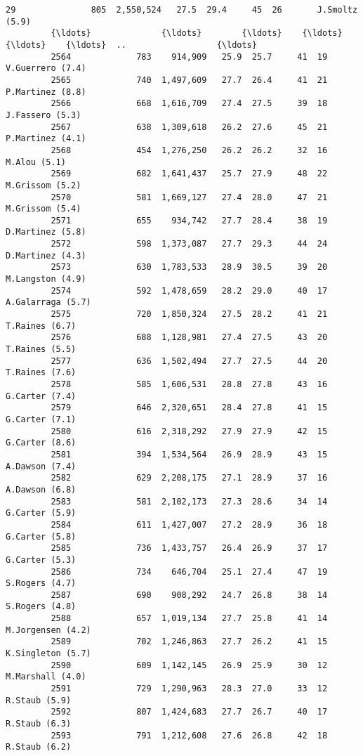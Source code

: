 \documentclass[11pt]{article}
\begin{document}
\begin{Verbatim}[commandchars=\\\{\}]
         29               805  2,550,524   27.5  29.4     45  26       J.Smoltz (5.9)   
         {\ldots}              {\ldots}        {\ldots}    {\ldots}   {\ldots}    {\ldots}  ..                  {\ldots}   
         2564             783    914,909   25.9  25.7     41  19     V.Guerrero (7.4)   
         2565             740  1,497,609   27.7  26.4     41  21     P.Martinez (8.8)   
         2566             668  1,616,709   27.4  27.5     39  18      J.Fassero (5.3)   
         2567             638  1,309,618   26.2  27.6     45  21     P.Martinez (4.1)   
         2568             454  1,276,250   26.2  26.2     32  16         M.Alou (5.1)   
         2569             682  1,641,437   25.7  27.9     48  22      M.Grissom (5.2)   
         2570             581  1,669,127   27.4  28.0     47  21      M.Grissom (5.4)   
         2571             655    934,742   27.7  28.4     38  19     D.Martinez (5.8)   
         2572             598  1,373,087   27.7  29.3     44  24     D.Martinez (4.3)   
         2573             630  1,783,533   28.9  30.5     39  20     M.Langston (4.9)   
         2574             592  1,478,659   28.2  29.0     40  17    A.Galarraga (5.7)   
         2575             720  1,850,324   27.5  28.2     41  21       T.Raines (6.7)   
         2576             688  1,128,981   27.4  27.5     43  20       T.Raines (5.5)   
         2577             636  1,502,494   27.7  27.5     44  20       T.Raines (7.6)   
         2578             585  1,606,531   28.8  27.8     43  16       G.Carter (7.4)   
         2579             646  2,320,651   28.4  27.8     41  15       G.Carter (7.1)   
         2580             616  2,318,292   27.9  27.9     42  15       G.Carter (8.6)   
         2581             394  1,534,564   26.9  28.9     43  15       A.Dawson (7.4)   
         2582             629  2,208,175   27.1  28.9     37  16       A.Dawson (6.8)   
         2583             581  2,102,173   27.3  28.6     34  14       G.Carter (5.9)   
         2584             611  1,427,007   27.2  28.9     36  18       G.Carter (5.8)   
         2585             736  1,433,757   26.4  26.9     37  17       G.Carter (5.3)   
         2586             734    646,704   25.1  27.4     47  19       S.Rogers (4.7)   
         2587             690    908,292   24.7  26.8     38  14       S.Rogers (4.8)   
         2588             657  1,019,134   27.7  25.8     41  14    M.Jorgensen (4.2)   
         2589             702  1,246,863   27.7  26.2     41  15    K.Singleton (5.7)   
         2590             609  1,142,145   26.9  25.9     30  12     M.Marshall (4.0)   
         2591             729  1,290,963   28.3  27.0     33  12        R.Staub (5.9)   
         2592             807  1,424,683   27.7  26.7     40  17        R.Staub (6.3)   
         2593             791  1,212,608   27.6  26.8     42  18        R.Staub (6.2)   
         

\end{Verbatim}
\end{document}
